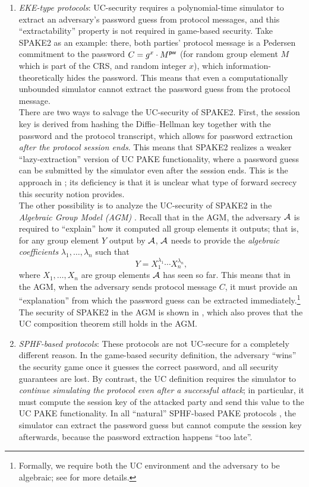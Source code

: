 \begin{enumerate}
  \item \emph{EKE-type protocols}: UC-security requires a polynomial-time simulator to extract an adversary's password guess from protocol messages, and this ``extractability'' property is not required in game-based security. Take SPAKE2 as an example: there, both parties' protocol message is a Pedersen commitment to the password $C = g^x \cdot M^{\mathsf{pw}}$ (for random group element $M$ which is part of the CRS, and random integer $x$), which information-theoretically hides the password. This means that even a computationally unbounded simulator cannot extract the password guess from the protocol message.\\
      There are two ways to salvage the UC-security of SPAKE2. First, the session key is derived from hashing the Diffie--Hellman key together with the password and the protocol transcript, which allows for password extraction \emph{after the protocol session ends}. This means that SPAKE2 realizes a weaker ``lazy-extraction'' version of UC PAKE functionality, where a password guess can be submitted by the simulator even after the session ends. This is the approach in \cite{C:ABBJKX20}; its deficiency is that it is unclear what type of forward secrecy this security notion provides. \\
      The other possibility is to analyze the UC-security of SPAKE2 in the \emph{Algebraic Group Model (AGM)} \cite{C:FucKilLos18}. Recall that in the AGM, the adversary $\mathcal{A}$ is required to ``explain'' how it computed all group elements it outputs; that is, for any group element $Y$ output by $\mathcal{A}$, $\mathcal{A}$ needs to provide the \emph{algebraic coefficients} $\lambda_1,\dots,\lambda_n$ such that
      \[
      Y = X_1^{\lambda_1}\cdots X_n^{\lambda_n},
      \]
      where $X_1,\dots,X_n$ are group elements $\mathcal{A}$ has seen so far. This means that in the AGM, when the adversary sends protocol message $C$, it must provide an ``explanation'' from which the password guess can be extracted immediately.\footnote{Formally, we require both the UC environment and the adversary to be algebraic; see \cite{AC:ABKLX21} for more details.} The security of SPAKE2 in the AGM is shown in \cite{AC:ABKLX21}, which also proves that the UC composition theorem still holds in the AGM.
  \item \emph{SPHF-based protocols}: These protocols are not UC-secure for a completely different reason. In the game-based security definition, the adversary ``wins'' the security game once it guesses the correct password, and all security guarantees are lost. By contrast, the UC definition requires the simulator to \emph{continue simulating the protocol even after a successful attack}; in particular, it must compute the session key of the attacked party and send this value to the UC PAKE functionality. In all ``natural'' SPHF-based PAKE protocols \cite{EC:KatOstYun01,SAC:JiaGon04,AC:KatVai09a,TCC:KatVai11}, the simulator can extract the password guess but cannot compute the session key afterwards, because the password extraction happens ``too late''. \\

\end{enumerate}
